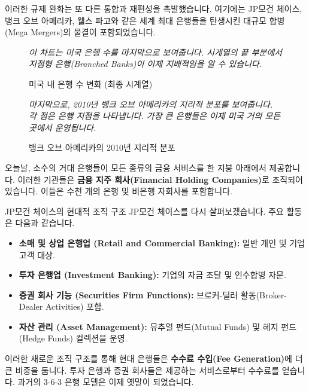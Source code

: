 \documentclass[11pt,a4paper]{article}
\theoremstyle{definition}
\begin{document}
이러한 규제 완화는 또 다른 통합과 재편성을 촉발했습니다. 여기에는 JP모건 체이스, 뱅크 오브 아메리카, 웰스 파고와 같은 세계 최대 은행들을 탄생시킨 대규모 합병(Mega Mergers)의 물결이 포함되었습니다.

\begin{figure}[h!]
    \centering
    \caption{미국 내 은행 수 변화 (최종 시계열)}
    \label{fig:us_banks_final}
    \textit{이 차트는 미국 은행 수를 마지막으로 보여줍니다. 시계열의 끝 부분에서 지점형 은행(Branched Banks)이 이제 지배적임을 알 수 있습니다.}
\end{figure}

\begin{figure}[h!]
    \centering
    \caption{뱅크 오브 아메리카의 2010년 지리적 분포}
    \label{fig:bank_of_america_2010}
    \textit{마지막으로, 2010년 뱅크 오브 아메리카의 지리적 분포를 보여줍니다. 각 점은 은행 지점을 나타냅니다. 가장 큰 은행들은 이제 미국 거의 모든 곳에서 운영됩니다.}
\end{figure}

오늘날, 소수의 거대 은행들이 모든 종류의 금융 서비스를 한 지붕 아래에서 제공합니다. 이러한 기관들은 \textbf{금융 지주 회사(Financial Holding Companies)}로 조직되어 있습니다. 이들은 수천 개의 은행 및 비은행 자회사를 포함합니다.

\begin{examplebox}{JP모건 체이스의 현대적 조직 구조}
JP모건 체이스를 다시 살펴보겠습니다. 주요 활동은 다음과 같습니다.
\begin{itemize}
    \item \textbf{소매 및 상업 은행업 (Retail and Commercial Banking):} 일반 개인 및 기업 고객 대상.
    \item \textbf{투자 은행업 (Investment Banking):} 기업의 자금 조달 및 인수합병 자문.
    \item \textbf{증권 회사 기능 (Securities Firm Functions):} 브로커-딜러 활동(Broker-Dealer Activities) 포함.
    \item \textbf{자산 관리 (Asset Management):} 뮤추얼 펀드(Mutual Funds) 및 헤지 펀드(Hedge Funds) 컬렉션을 운영.
\end{itemize}
이러한 새로운 조직 구조를 통해 현대 은행들은 \textbf{수수료 수입(Fee Generation)}에 더 큰 비중을 둡니다. 투자 은행과 증권 회사들은 제공하는 서비스로부터 수수료를 얻습니다. 과거의 3-6-3 은행 모델은 이제 옛말이 되었습니다.
\end{examplebox}
\end{document}
